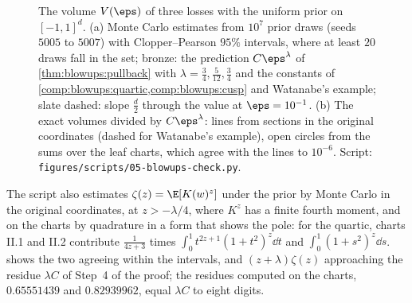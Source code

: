 \begin{refsection}
\begin{figure}[t]
\begin{fullwidth}
\end{fullwidth}
\caption{The volume $V(\eps)$ of three losses with the uniform prior on $[-1,1]^d$. (a) Monte Carlo estimates from $10^7$ prior draws (seeds $5005$ to $5007$) with Clopper--Pearson $95\%$ intervals, where at least $20$ draws fall in the set; bronze: the prediction $C\eps^\lambda$ of \cref{thm:blowups:pullback} with $\lambda=\frac34,\frac5{12},\frac34$ and the constants of \cref{comp:blowups:quartic,comp:blowups:cusp} and Watanabe's example; slate dashed: slope $\frac d2$ through the value at $\eps=10^{-1}$. (b) The exact volumes divided by $C\eps^\lambda$: lines from sections in the original coordinates (dashed for Watanabe's example), open circles from the sums over the leaf charts, which agree with the lines to $10^{-6}$. Script: \texttt{figures/scripts/05-blowups-check.py}.}\label{fig:blowups:volume}
\end{figure}

The script also estimates $\zeta(z)=\E[K(w)^z]$ under the prior by Monte Carlo in the original coordinates, at $z>-\lambda/4$, where $K^z$ has a finite fourth moment, and on the charts by quadrature in a form that shows the pole: for the quartic, charts II.1 and II.2 contribute $\frac1{4z+3}$ times $\int_0^1t^{2z+1}(1+t^2)^z\dd t$ and $\int_0^1(1+s^2)^z\dd s$.  shows the two agreeing within the intervals, and $(z+\lambda)\zeta(z)$ approaching the residue $\lambda C$ of Step~4 of the proof; the residues computed on the charts, $0.65551439$ and $0.82939962$, equal $\lambda C$ to eight digits.


\end{refsection}
